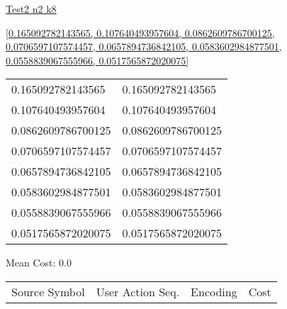 \documentclass[12pt]{article}
\begin{document}
\noindent \url{Test2 n2 k8}

\noindent \url{[0.165092782143565, 0.107640493957604, 0.0862609786700125, 0.0706597107574457, 0.0657894736842105, 0.0583602984877501, 0.0558839067555966, 0.0517565872020075]}

\noindent\begin{tt}
\begin{small}
\begin{bundle}{}
\end{bundle}
\end{small}
\end{tt}
\newpage%
\begin{tabular}{l l}0.165092782143565	&	0.165092782143565\\
0.107640493957604	&	0.107640493957604\\
0.0862609786700125	&	0.0862609786700125\\
0.0706597107574457	&	0.0706597107574457\\
0.0657894736842105	&	0.0657894736842105\\
0.0583602984877501	&	0.0583602984877501\\
0.0558839067555966	&	0.0558839067555966\\
0.0517565872020075	&	0.0517565872020075\\
\end{tabular}\newpage
\noindent
\noindent Mean Cost: 0.0\\
\begin{tabular}{l l l l}
Source Symbol	&	User Action Seq.	&	Encoding	&	Cost\\
\end{tabular}
\end{document}
